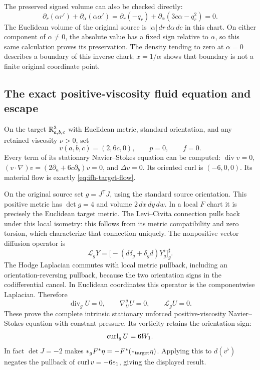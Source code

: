 The preserved signed volume can also be checked directly:
\[
 \partial_r(\alpha r')+\partial_\alpha(\alpha\alpha')
 =\partial_r(-q_r)+\partial_\alpha(3c\alpha-q_r^2)=0.
\]
The Euclidean volume of the original source is
$|\alpha|\,dr\,d\alpha\,dc$ in this chart. On either component of
$\alpha\ne0$, the absolute value has a fixed sign relative to $\alpha$,
so this same calculation proves its preservation. The density tending
to zero at $\alpha=0$ describes a boundary of this inverse chart;
$x=1/\alpha$ shows that boundary is not a finite original coordinate point.

\subsection{The exact positive-viscosity fluid equation and escape}

On the target $\mathbb R^3_{a,b,c}$ with Euclidean metric, standard orientation,
and any retained viscosity $\nu>0$, set
\[
 v(a,b,c)=(2,6c,0),\qquad p=0,\qquad f=0.
\]
Every term of its stationary Navier--Stokes equation can be computed:
$\operatorname{div}v=0$,
$(v\cdot\nabla)v=(2\partial_a+6c\partial_b)v=0$, and
$\Delta v=0$. Its oriented curl is $(-6,0,0)$.
Its material flow is exactly \eqref{eq:ifh-target-flow}.

On the original source set $g=J^{\mathsf T}J$, using the standard
source orientation. This positive metric has $\det g=4$ and volume
$2\,dx\,dy\,dw$. In a local $F$ chart it is precisely the Euclidean
target metric. The Levi--Civita connection pulls back under this local
isometry: this follows from its metric compatibility and zero torsion,
which characterize that connection uniquely. The nonpositive vector
diffusion operator is
\[
 \mathcal L_g Y=\bigl[-(d\delta_g+\delta_gd)Y^\flat_g\bigr]^\sharp_g.
\]
The Hodge Laplacian commutes with local metric pullback, including an
orientation-reversing pullback, because the two orientation signs in
the codifferential cancel. In Euclidean coordinates this operator is
the componentwise Laplacian. Therefore
\[
 \operatorname{div}_gU=0,\qquad
 \nabla^g_UU=0,\qquad \mathcal L_gU=0.
\]
These prove the complete intrinsic stationary unforced
positive-viscosity Navier--Stokes equation with constant pressure.
Its vorticity retains the orientation sign:
\[
 \operatorname{curl}_g U=6W_1.
\]
In fact $\det J=-2$ makes
$*_gF^*\eta=-F^*(*_{\rm target}\eta)$.
Applying this to $d(v^\flat)$ negates the pullback of
$\operatorname{curl} v=-6e_1$, giving the displayed result.

